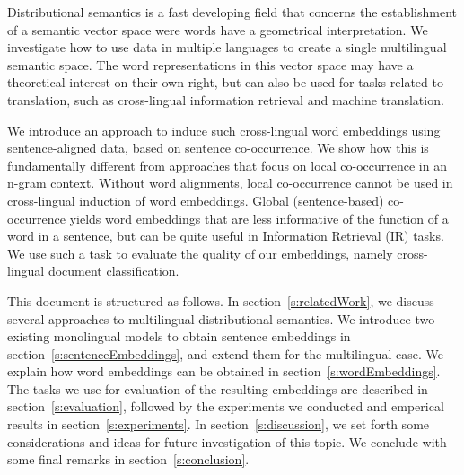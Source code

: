 









Distributional semantics is a fast developing field that concerns the establishment of a semantic vector space were words have a geometrical interpretation. We investigate how to use data in multiple languages to create a single multilingual semantic space. The word representations in this vector space may have a theoretical interest on their own right, but can also be used for tasks related to translation, such as cross-lingual information retrieval and machine translation. 

We introduce an approach to induce such cross-lingual word embeddings using sentence-aligned data, based on sentence co-occurrence. We show how this is fundamentally different from approaches that focus on local co-occurrence in an n-gram context. Without word alignments, local co-occurrence cannot be used in cross-lingual induction of word embeddings. Global (sentence-based) co-occurrence yields word embeddings that are less informative of the function of a word in a sentence, but can be quite useful in Information Retrieval (IR) tasks. We use such a task to evaluate the quality of our embeddings, namely cross-lingual document classification.

This document is structured as follows. In section~\ref{s:relatedWork}, we discuss several  approaches to multilingual distributional semantics. We introduce two existing monolingual models to obtain sentence embeddings in section~\ref{s:sentenceEmbeddings}, and extend them for the multilingual case. We explain how word embeddings can be obtained in section~\ref{s:wordEmbeddings}. The tasks we use for evaluation of the resulting embeddings are described in section~\ref{s:evaluation}, followed by the experiments we conducted and emperical results in section~\ref{s:experiments}. In section~\ref{s:discussion}, we set forth some considerations and ideas for future investigation of this topic. We conclude with some final remarks in section~\ref{s:conclusion}.

